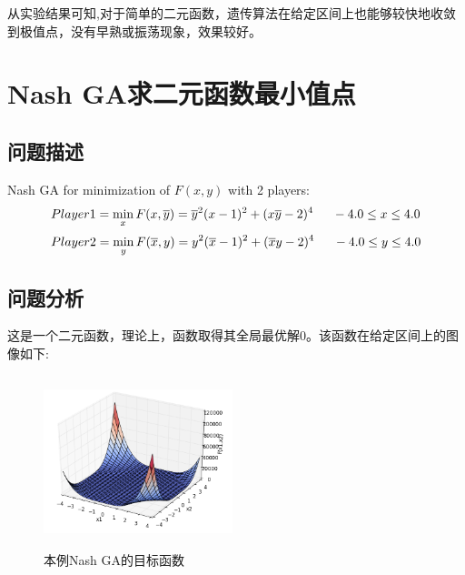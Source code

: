 \documentclass[UTF8]{ctexart}
\begin{document}
\indent 从实验结果可知,对于简单的二元函数，遗传算法在给定区间上也能够较快地收敛到极值点，没有早熟或振荡现象，效果较好。

\section{Nash GA求二元函数最小值点}

\subsection{问题描述}
Nash GA for minimization of $F(x,y)$ with 2 players:
\[ Player1=\min_x F(x,\overline{y})={\overline{y}}^2 (x-1)^2+(x \overline{y}-2)^4 \indent -4.0 \leq x \leq 4.0 \\ \]
\[ Player2=\min_y F(\overline{x},y)=y^2 (\overline{x}-1)^2+(\overline{x}y-2)^4 \indent -4.0 \leq y \leq 4.0 \\ \]

\subsection{问题分析}
这是一个二元函数，理论上，函数取得其全局最优解0。该函数在给定区间上的图像如下:
\begin{figure}[htbp]\centering
\includegraphics[width=5.5cm,height=5cm]{../pic/T2_func.png}
\caption{本例Nash GA的目标函数}
\end{figure}
\end{document}
